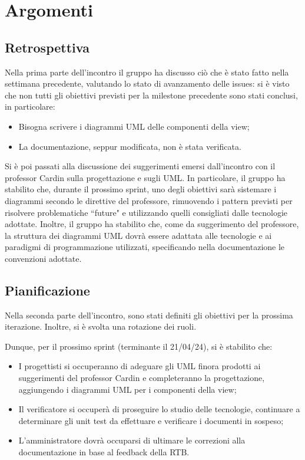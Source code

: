 \section{Argomenti}
\subsection{Retrospettiva}
Nella prima parte dell'incontro il gruppo ha discusso ciò che è stato fatto nella settimana precedente, valutando lo stato di avanzamento delle issues: si è visto che non tutti gli obiettivi previsti per la milestone precedente sono stati conclusi, in particolare:
\begin{itemize}
    \item Bisogna scrivere i diagrammi UML delle componenti della view;
    \item La documentazione, seppur modificata, non è stata verificata.
\end{itemize}
Si è poi passati alla discussione dei suggerimenti emersi dall'incontro con il professor Cardin sulla progettazione e sugli UML.
In particolare, il gruppo ha stabilito che, durante il prossimo sprint, uno degli obiettivi sarà sistemare i diagrammi secondo le direttive del professore, rimuovendo i pattern previsti per risolvere problematiche ``future" e utilizzando quelli consigliati dalle tecnologie adottate. Inoltre, il gruppo ha stabilito che, come da suggerimento del professore, la struttura dei diagrammi UML dovrà essere adattata alle tecnologie e ai paradigmi di programmazione utilizzati, specificando nella documentazione le convenzioni adottate.

\subsection{Pianificazione}
Nella seconda parte dell'incontro, sono stati definiti gli obiettivi per la prossima iterazione. Inoltre, si è svolta una rotazione dei ruoli.
\bigskip

\noindent Dunque, per il prossimo sprint (terminante il 21/04/24), si è stabilito che:
\begin{itemize}
    \item I progettisti si occuperanno di adeguare gli UML finora prodotti ai suggerimenti del professor Cardin e completeranno la progettazione, aggiungendo i diagrammi UML per i componenti della view;
    \item Il verificatore si occuperà di proseguire lo studio delle tecnologie, continuare a determinare gli unit test da effettuare e verificare i documenti in sospeso;
    \item L'amministratore dovrà occuparsi di ultimare le correzioni alla documentazione in base al feedback della RTB.
\end{itemize}

